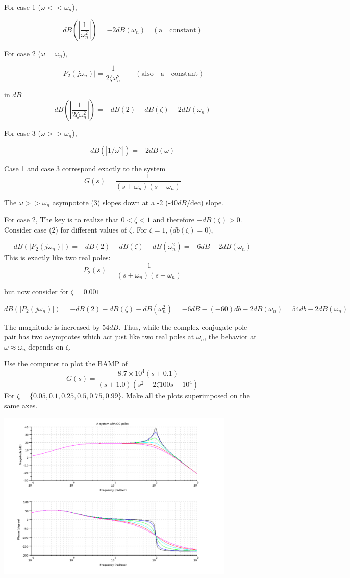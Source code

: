 For case 1 ($\omega << \omega_n$),

\[
dB(|\frac{1}{\omega_n^2}|) = -2dB(\omega_n) \quad \mathrm{(a\quad constant)}
\]

For case 2 ($\omega =  \omega_n$),

\[
|P_2(j\omega_n)| =  \frac {1}  {2\zeta \omega_n^2} \qquad \mathrm{(also\quad a\quad constant)}
\]

in $dB$
\[
dB(| \frac {1}  {2\zeta \omega_n^2} |) =  -dB(2) -dB(\zeta) -2dB(\omega_n)
\]

For case 3 ($\omega >>  \omega_n$),

\[
dB(|1/\omega^2|) = -2dB(\omega)
\]

Case 1 and case 3 correspond exactly to the system
\[
G(s) = \frac {1}{(s+\omega_n)(s+\omega_n)}
\]


The $\omega >> \omega_n$ asympotote (3) slopes down at a -2 (-40$dB$/dec) slope.  


For case 2, The key is to realize that $0<\zeta<1$ and therefore $-dB(\zeta) > 0$.  
Consider case (2) for different values of $\zeta$.  For $\zeta = 1$, ($db(\zeta)=0$),

\[
dB(|P_2(j\omega_n)|) =  -dB(2) -dB(\zeta) -dB(\omega_n^2) = -6dB -2 dB(\omega_n)
\]
This is exactly like two real poles:
\[
P_2(s) = \frac {1}{(s+\omega_n)(s+\omega_n)}
\]

but now consider for $\zeta= 0.001$

\[
dB(|P_2(j\omega_n)|) =  -dB(2) -dB(\zeta) -dB(\omega_n^2) = -6dB -(-60)db -2 dB(\omega_n) = 54db-2dB(\omega_n)
\]

The magnitude is increased by $54dB$.   Thus, while the complex conjugate pole pair has two asymptotes which act just like two real poles at $\omega_n$, the behavior at $\omega \approx \omega_n$ depends on $\zeta$.

\begin{ExampleSmall}

Use the computer to plot the BAMP of
\[
G(s) =  \frac{8.7\times10^4(s+0.1)}    {(s+1.0)(s^2 + 2\zeta100s + 10^4)}
\]
For $\zeta = \{0.05, 0.1, 0.25, 0.5, 0.75, 0.99\}$.  Make all the plots superimposed on the same axes.


\includegraphics[width=4.5in]{figs05/zetasbodea.png}

\end{ExampleSmall}

